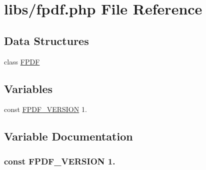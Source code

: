 \hypertarget{fpdf_8php}{}\section{libs/fpdf.php File Reference}
\label{fpdf_8php}
\subsection*{Data Structures}
\begin{DoxyCompactItemize}
\item 
class \hyperlink{class_f_p_d_f}{F\+P\+D\+F}
\end{DoxyCompactItemize}
\subsection*{Variables}
\begin{DoxyCompactItemize}
\item 
const \hyperlink{fpdf_8php_a77fb399caf1a81d2cdf17e98d954b512}{F\+P\+D\+F\+\_\+\+V\+E\+R\+S\+I\+O\+N} \textquotesingle{}1.\textquotesingle{}
\end{DoxyCompactItemize}


\subsection{Variable Documentation}
\hypertarget{fpdf_8php_a77fb399caf1a81d2cdf17e98d954b512}{}
\subsubsection[{F\+P\+D\+F\+\_\+\+V\+E\+R\+S\+I\+O\+N}]{\setlength{\rightskip}{0pt plus 5cm}const F\+P\+D\+F\+\_\+\+V\+E\+R\+S\+I\+O\+N \textquotesingle{}1.\textquotesingle{}}\label{fpdf_8php_a77fb399caf1a81d2cdf17e98d954b512}
